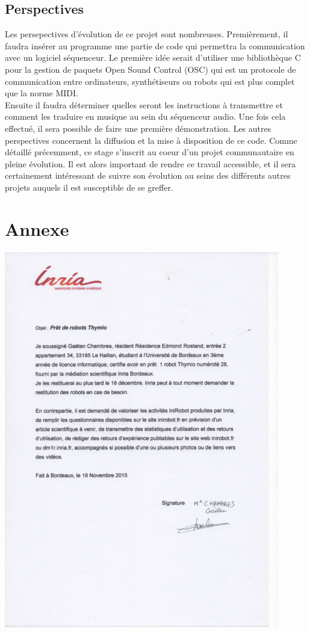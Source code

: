 \documentclass[a4paper, 12pt]{report}
\begin{document}
\section{Perspectives}
Les persepectives d'évolution de ce projet sont nombreuses. Premièrement, il faudra insérer au programme une partie de code qui permettra la communication avec un logiciel séquenceur. Le première idée serait d'utiliser une bibliothèque C pour la gestion de paquets Open Sound Control (OSC) qui est un protocole de communication entre ordinateurs, synthétiseurs ou robots qui est plus complet que la norme MIDI.\\
Ensuite il faudra déterminer quelles seront les instructions à transmettre et comment les traduire en musique au sein du séquenceur audio. Une fois cela effectué, il sera possible de faire une première démonstration.
Les autres perspectives concernent la diffusion et la mise à disposition de ce code. Comme détaillé précemment, ce stage s'inscrit au coeur d'un projet communautaire en pleine évolution. Il est alors important de rendre ce travail accessible, et il sera certainement intéressant de suivre son évolution au seins des différents autres projets auquels il est susceptible de se greffer.


\nocite{*}

\chapter{Annexe}
\includegraphics[width=0.9\textwidth]{pret.png}
\end{document}
